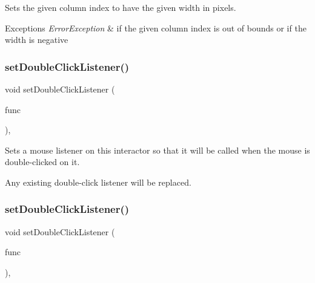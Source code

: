 Sets the given column index to have the given width in pixels. 


\begin{DoxyExceptions}{Exceptions}
{\em Error\+Exception} & if the given column index is out of bounds or if the width is negative \\
\hline
\end{DoxyExceptions}
\mbox{\label{classGInteractor_ac29f9a3462458e165fae3a1f046ee77a}} 
\subsubsection{\texorpdfstring{set\+Double\+Click\+Listener()}{setDoubleClickListener()}\hspace{0.1cm}{\footnotesize\ttfamily [1/2]}}
{\footnotesize\ttfamily void set\+Double\+Click\+Listener (\begin{DoxyParamCaption}\item[{G\+Event\+Listener}]{func }\end{DoxyParamCaption})\hspace{0.3cm}{\ttfamily [virtual]}, {\ttfamily [inherited]}}



Sets a mouse listener on this interactor so that it will be called when the mouse is double-\/clicked on it. 

Any existing double-\/click listener will be replaced. \mbox{\label{classGInteractor_a50096194d66f48c92dd4c512d41bfc76}} 
\subsubsection{\texorpdfstring{set\+Double\+Click\+Listener()}{setDoubleClickListener()}\hspace{0.1cm}{\footnotesize\ttfamily [2/2]}}
{\footnotesize\ttfamily void set\+Double\+Click\+Listener (\begin{DoxyParamCaption}\item[{G\+Event\+Listener\+Void}]{func }\end{DoxyParamCaption})\hspace{0.3cm}{\ttfamily [virtual]}, {\ttfamily [inherited]}}



